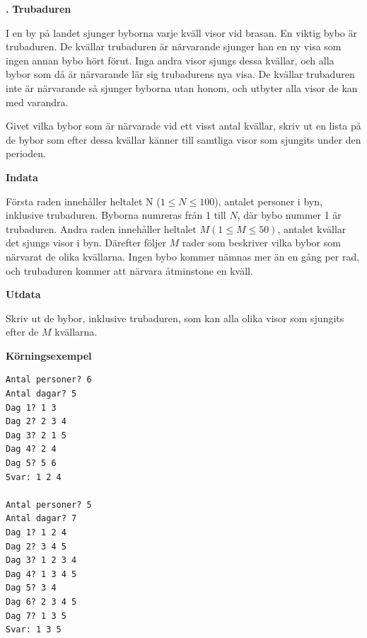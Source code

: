 \documentclass[a4paper,12pt]{article}
\newcounter{iii}\setcounter{iii}{0}
\def\i{\bigskip\noindent\refstepcounter{iii}\textbf{\arabic{iii}.} }
\begin{document}
\i \textbf{Trubaduren}

I en by på landet sjunger byborna varje kväll visor vid brasan. En viktig bybo är trubaduren. De kvällar trubaduren är närvarande sjunger han en ny visa som ingen annan bybo hört förut. Inga andra visor sjungs dessa kvällar, och alla bybor som då är närvarande lär sig trubadurens nya visa. De kvällar trubaduren inte är närvarande så sjunger byborna utan honom, och utbyter alla visor de kan med varandra.

Givet vilka bybor som är närvarade vid ett visst antal kvällar, skriv ut en lista på de bybor som efter dessa kvällar känner till samtliga visor som sjungits under den perioden.

\textbf{Indata}

Första raden innehåller heltalet N ($1 \le N \le 100$), antalet personer i byn, inklusive trubaduren. Byborna numreras från 1 till $N$, där bybo nummer 1 är trubaduren. Andra raden innehåller heltalet $M (1 \le M \le 50)$, antalet kvällar det sjungs visor i byn. Därefter följer $M$ rader som beskriver vilka bybor som närvarat de olika kvällarna. Ingen bybo kommer nämnas mer än en gång per rad, och trubaduren kommer att närvara åtminstone en kväll.

\textbf{Utdata}

Skriv ut de bybor, inklusive trubaduren, som kan alla olika visor som sjungits efter de $M$ kvällarna. 

\textbf{Körningsexempel}
\begin{lstlisting}
Antal personer? 6
Antal dagar? 5
Dag 1? 1 3
Dag 2? 2 3 4
Dag 3? 2 1 5
Dag 4? 2 4
Dag 5? 5 6
Svar: 1 2 4

Antal personer? 5
Antal dagar? 7
Dag 1? 1 2 4
Dag 2? 3 4 5
Dag 3? 1 2 3 4
Dag 4? 1 3 4 5
Dag 5? 3 4
Dag 6? 2 3 4 5
Dag 7? 1 3 5
Svar: 1 3 5
\end{lstlisting}

\end{document}
